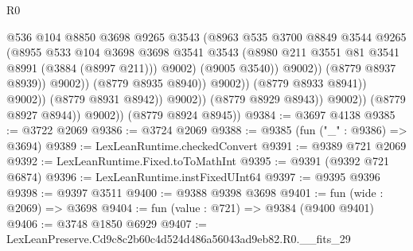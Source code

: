 \begin{lexlean}{R0}
\begin{coremodule}
                                              @536
                                              @104
                                              @8850
                                              @3698
                                              @9265
                                              @3543
                                              (@8963
                                                @535
                                                @3700
                                                @8849
                                                @3544
                                                @9265
                                                (@8955
                                                  @533
                                                  @104
                                                  @3698
                                                  @3698
                                                  @3541
                                                  @3543
                                                  (@8980
                                                    @211
                                                    @3551
                                                    @81
                                                    @3541
                                                    @8991
                                                    (@3884 (@8997 @211)))
                                                  @9002)
                                                (@9005 @3540))
                                              @9002))
                                          (@8779 @8937 @8939))
                                        @9002))
                                    (@8779 @8935 @8940))
                                  @9002))
                              (@8779 @8933 @8941))
                            @9002))
                        (@8779 @8931 @8942))
                      @9002))
                  (@8779 @8929 @8943))
                @9002))
            (@8779 @8927 @8944))
          @9002))
      (@8779 @8924 @8945))
@9384 := @3697 @4138
@9385 := @3722 @2069
@9386 := @3724 @2069
@9388 := @9385 (fun ("_" : @9386) => @3694)
@9389 := LexLeanRuntime.checkedConvert
@9391 := @9389 @721 @2069
@9392 := LexLeanRuntime.Fixed.toToMathInt
@9395 := @9391 (@9392 @721 @6874)
@9396 := LexLeanRuntime.instFixedUInt64
@9397 := @9395 @9396
@9398 := @9397 @3511
@9400 := @9388 @9398 @3698
@9401 := fun (wide : @2069) => @3698
@9404 := fun (value : @721) => @9384 (@9400 @9401)
@9406 := @3748 @1850 @6929
@9407 := LexLeanPreserve.Cd9c8c2b60c4d524d486a56043ad9eb82.R0.__fits_29

\end{coremodule}
\end{lexlean}
